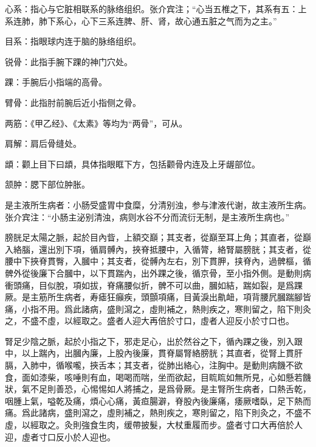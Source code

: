 \documentclass[12pt]{ctexbook}%
\begin{document}

\begin{jiaozhu}
  \item 心系：指心与它脏相联系的脉络组织。张介宾注；“心当五椎之下，其系有五：上系连肺，肺下系心，心下三系连脾、肝、肾，故心通五脏之气而为之主。”
  \item 目系：指眼球内连于脑的脉络组织。
  \item 锐骨：此指手腕下踝的神门穴处。
  \item 踝：手腕后小指端的高骨。
  \item 臂骨：此指肘前腕后近小指侧之骨。
  \item 两筋：《甲乙经》、《太素》等均为“两骨”，可从。
  \item 肩解：肩后骨缝处。
  \item 䪼：颧上目下曰䪼，具体指眼眶下方，包括颧骨内连及上牙龌部位。
  \item 颔肿：腮下部位肿胀。
  \item 是主液所生病者：小肠受盛胃中食糜，分清别浊，参与津液代谢，故主液所生病。张介宾注：“小肠主泌别清浊，病则水谷不分而流衍无制，是主液所生病也。”
\end{jiaozhu}


\begin{yuanwen}
膀胱足太陽之脈，起於目內眥，上額交巔；其支者，從巔至耳上角；其直者，從巔入絡腦，還出別下項，循肩髆內，挾脊抵腰中，入循膂，絡腎屬膀胱；其支者，從腰中下挾脊貫臀，入膕中；其支者，從髆內左右，別下貫胛，挟脊內，過髀樞，循髀外從後廉下合膕中，以下貫踹內，出外踝之後，循京骨，至小指外側。是動則病衝頭痛，目似脫，項如拔，脊痛腰似折，髀不可以曲，膕如結，踹如裂，是爲踝厥。是主筋所生病者，寿瘧狂癲疾，頭顫項痛，目黃淚出鼽衄，項背腰凥膕踹腳皆痛，小指不用。爲此諸病，盛則瀉之，虛則補之，熱則疾之，寒則留之，陷下則灸之，不盛不虛，以經取之。盛者人迎大再倍於寸口，虛者人迎反小於寸口也。

腎足少陰之脈，起於小指之下，邪走足心，出於然谷之下，循內踝之後，別入跟中，以上踹內，出膕內廉，上股內後廉，貫脊屬腎絡膀胱；其直者，從腎上貫肝膈，入肺中，循喉嚨，挾舌本；其支者，從肺出絡心，注胸中。是動則病饑不欲食，面如漆柴，咳唾則有血，喝喝而喘，坐而欲起，目䀮䀮如無所見，心如懸若饑狀，氣不足則善恐，心惕惕如人將捕之，是爲骨厥。是主腎所生病者，口熱舌乾，咽腫上氣，嗌乾及痛，煩心心痛，黃疸腸澼，脊股內後廉痛，痿厥嗜臥，足下熱而痛。爲此諸病，盛則瀉之，虛則補之，熱則疾之，寒則留之，陷下則灸之，不盛不虛，以經取之。灸則強食生肉，缓帶披髮，大杖重履而步。盛者寸口大再倍於人迎，虛者寸口反小於人迎也。
\end{yuanwen}
\end{document}
